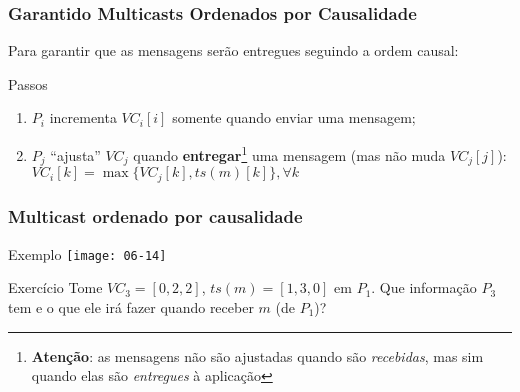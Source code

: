 \documentclass[Ligatures=TeX,table,brazil,svgnames,usetotalslideindicator,compress,10pt]{beamer}
\begin{document}
\begin{frame}
  \frametitle{Garantido Multicasts Ordenados por Causalidade}

  Para garantir que as mensagens serão entregues seguindo a ordem causal:

  \begin{block}{Passos}
    \begin{enumerate}
    \item $P_i$ incrementa $VC_i[i]$ somente quando enviar uma mensagem;
    \item $P_j$ \alert{``ajusta''} $VC_j$ quando
      \textbf{entregar}\footnote{\textbf{Atenção}: as mensagens não
        são ajustadas quando são \emph{recebidas}, mas sim quando elas
        são \emph{entregues} à aplicação} uma mensagem (mas não muda
      $VC_j[j]$): $VC_i[k] = \max\{VC_j[k], ts(m)[k]\}, \forall k$
    \end{enumerate}

  \end{block}

  \pause

\end{frame}

\begin{frame}
  \frametitle{Multicast ordenado por causalidade}

  \begin{exampleblock}{Exemplo}
    \centering
    \texttt{[image: 06-14]}
  \end{exampleblock}

  \pause
  \begin{exampleblock}{Exercício}
    Tome $VC_3 = [0,2,2]$, $ts(m) = [1,3,0]$ em $P_1$. Que informação $P_3$ tem e o que ele irá fazer quando receber $m$ (de $P_1$)?
  \end{exampleblock}

\end{frame}
\end{document}
